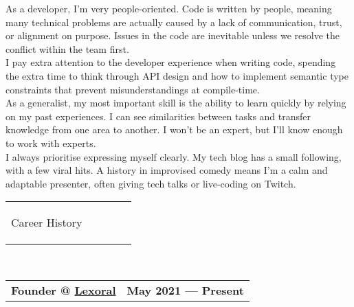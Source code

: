 \documentclass[hidelinks, 12pt, a4paper]{article}
\begin{document}
	\begin{multicols}{2}
		As a developer, I'm very people-oriented.
		Code is written by people, meaning many technical problems are actually caused by a lack of communication, trust, or alignment on purpose.
		Issues in the code are inevitable unless we resolve the conflict within the team first.\\
		
		I pay extra attention to the developer experience when writing code, spending the extra time to think through API design and how to implement semantic type constraints that prevent misunderstandings at compile-time.\\
		
		As a generalist, my most important skill is the ability to learn quickly by relying on my past experiences.
		I can see similarities between tasks and transfer knowledge from one area to another.
		I won't be an expert, but I'll know enough to work with experts.\\
		
		I always prioritise expressing myself clearly.
		My tech blog has a small following, with a few viral hits.
		A history in improvised comedy means I'm a calm and adaptable presenter, often giving tech talks or live-coding on Twitch.\\
	\end{multicols}
	
	\newpage
	
	\begin{tabularx}{\textwidth}{@{}llXrr@{}}
		\begin{Large}Career History\end{Large}&
		\rule{80pt}{1pt}&&&
	\end{tabularx}\\
	
	\begin{tabularx}{\linewidth}{@{}Xr@{}}
		\textbf{Founder @ \href{https://www.lexoral.com/}{Lexoral}} & \textbf{May 2021 --- Present}
	\end{tabularx}\vspace{2pt}
\end{document}
